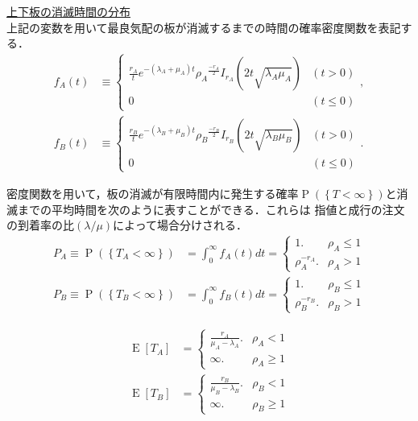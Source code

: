 \documentclass[a4j,papersize,disablejfam,slide,14pt]{jsarticle}
\def\Exp#1{\operatorname{E} \left[ #1 \right]} %
\def\exp#1{e^{#1}} %
\def\prob#1{\operatorname{P} \left(\left\{ #1 \right\}\right)} %
\begin{document}
\underline{\large 上下板の消滅時間の分布}\\
    上記の変数を用いて最良気配の板が消滅するまでの時間の確率密度関数を表記する．
    \begin{align}
    	f_A(t) &\equiv 
        \begin{cases}
        		\frac{r_A}{t} \exp{-(\lambda_A + \mu_A)t} {\rho_A}^{\frac{-r_A}{2}} I_{r_A}(2t\sqrt{\lambda_A \mu_A}) & (t > 0) \\
            	0 & (t \leq 0)
        \end{cases},\\
        f_B(t) &\equiv 
        \begin{cases}
        		\frac{r_B}{t} \exp{-(\lambda_B + \mu_B)t} {\rho_B}^{\frac{-r_B}{2}} I_{r_B}(2t\sqrt{\lambda_B \mu_B}) & (t > 0) \\
            	0 & (t \leq 0)
        \end{cases}.
    \end{align}
    
    密度関数を用いて，板の消滅が有限時間内に発生する確率$\prob{T < \infty}$と消滅までの平均時間を次のように表すことができる．これらは
    指値と成行の注文の到着率の比$(\lambda/\mu)$によって場合分けされる．
    \begin{align}
    	P_A \equiv \prob{T_A < \infty} &= \int_{0}^{\infty} f_A(t) dt =
        \begin{cases}
        	1. & \rho_A \leq 1  \\
            \rho_A^{-r_A}. & \rho_A > 1
        \end{cases} \\
        P_B \equiv \prob{T_B < \infty} &= \int_{0}^{\infty} f_B(t) dt =
        \begin{cases}
        	1. & \rho_B \leq 1  \\
            \rho_B^{-r_B}. & \rho_B > 1
        \end{cases}
    \end{align}
    
    \begin{align}
    	\Exp{T_A} &= \begin{cases}
        	\frac{r_A}{\mu_A - \lambda_A}. & \rho_A < 1 \\
        	\infty. & \rho_A \geq 1
        \end{cases}\\
        \Exp{T_B} &= \begin{cases}
        	\frac{r_B}{\mu_B - \lambda_B}. & \rho_B < 1 \\
        	\infty. & \rho_B \geq 1
        \end{cases}
    \end{align}
    
\end{document}
